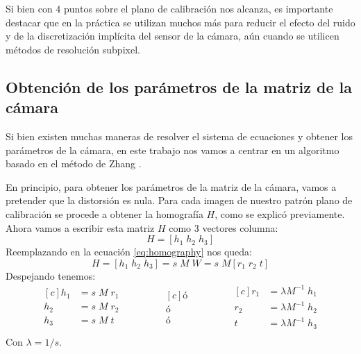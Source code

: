 Si bien con $4$ puntos sobre el plano de calibración nos alcanza, es importante destacar que en la práctica se utilizan muchos más para reducir el efecto del ruido y de la discretización implícita del sensor de la cámara, aún cuando se utilicen métodos de resolución subpixel. 


\subsection{Obtención de los parámetros de la matriz de la cámara}

Si bien existen muchas maneras de resolver el sistema de ecuaciones y obtener los parámetros de la cámara, en este trabajo nos vamos a centrar en un algoritmo basado en el método de Zhang \cite{bradski2008learning}\cite{zhang2000flexible}.

En principio, para obtener los parámetros de la matriz de la cámara, vamos a pretender que la distorsión es nula. Para cada imagen de nuestro patrón plano de calibración se procede a obtener la homografía $H$, como se explicó previamente. Ahora vamos a escribir esta matriz $H$ como 3 vectores columna:
\begin{equation*}
    H = [h_1 \; h_2 \; h_3]
\end{equation*}
Reemplazando en la ecuación \eqref{eq:homography} nos queda:
\begin{equation*}
    H = [h_1 \; h_2 \; h_3] = s \; M \; W = s \; M [r_1 \; r_2 \; t]
\end{equation*}
Despejando tenemos:
\begin{equation}\label{eq:homography2}
    \begin{aligned}[c]
        h_1 &= s \; M \; r_1\\
        h_2 &= s \; M \; r_2\\
        h_3 &= s \; M \; t\\
    \end{aligned}
    \qquad \qquad
    \begin{aligned}[c]
        ó\\
        ó\\
        ó\\
    \end{aligned}
    \qquad \qquad
    \begin{aligned}[c]
        r_1 &= \lambda M^{-1} \; h_1\\
        r_2 &= \lambda M^{-1} \; h_2\\
        t  &= \lambda M^{-1} \; h_3\\
    \end{aligned}
\end{equation}
Con $\lambda = 1/s$.

